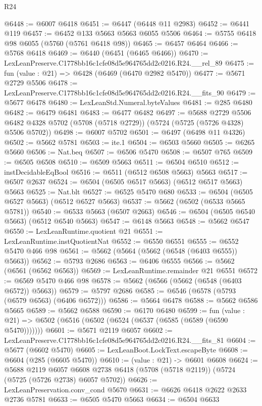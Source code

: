 \begin{lexlean}{R24}
\begin{coremodule}
@6448 := @6007 @6418
@6451 := @6447 (@6448 @11 @2983)
@6452 := @6441 @119
@6457 := @6452 @133 @5663 @5663 @6055 @5506
@6464 := @5755 @6418 @98 @6055 (@5760 (@5761 @6418 @98))
@6465 := @6457 @6464
@6466 := @5768 @6418
@6469 := @6440 (@6451 (@6465 @6466))
@6470 := LexLeanPreserve.C1778bb16c1cfe08d5e964765dd2c0216.R24.__rel_89
@6475 := fun (value : @21) => @6428 (@6469 (@6470 @2982 @5470))
@6477 := @5671 @2729 @5506
@6478 := LexLeanPreserve.C1778bb16c1cfe08d5e964765dd2c0216.R24.__fits_90
@6479 := @5677 @6478
@6480 := LexLeanStd.Numeral.byteValues
@6481 := @285 @6480
@6482 := @6479 @6481
@6483 := @6477 @6482
@6497 := @5688
    @2729
    @5506
    @6482
    @4328
    @5702
    (@5708 (@5718 @2729))
    (@5724 (@5725 (@5726 @4328) @5506 @5702))
@6498 := @6007 @5702
@6501 := @6497 (@6498 @11 @4326)
@6502 := @5662 @5781
@6503 := ite.{1}
@6504 := @6503 @5660
@6505 := @6265 @5660
@6506 := Nat.beq
@6507 := @6506 @5470
@6508 := @6507 @765
@6509 := @6505 @6508
@6510 := @6509 @5663
@6511 := @6504 @6510
@6512 := instDecidableEqBool
@6516 := @6511 (@6512 @6508 @5663) @5663
@6517 := @6507 @2637
@6524 := @6504 (@6505 @6517 @5663) (@6512 @6517 @5663) @5663
@6525 := Nat.blt
@6527 := @6525 @5470 @680
@6533 := @6504 (@6505 @6527 @5663) (@6512 @6527 @5663)
@6537 := @5662 (@6502 (@6533 @5665 @5781))
@6540 := @6533 @5663 (@6507 @2663)
@6546 := @6504 (@6505 @6540 @5663) (@6512 @6540 @5663)
@6547 := @6148 @5663
@6548 := @5662 @6547
@6550 := LexLeanRuntime.quotient @21
@6551 := LexLeanRuntime.instQuotientNat
@6552 := @6550 @6551
@6555 := @6552 @5470 @466 @98
@6561 := @5662 (@5664 (@5662 (@6548 (@6403 @6555)) @5663))
@6562 := @5793 @2686
@6563 := @6406 @6555
@6566 := @5662 (@6561 (@6562 @6563))
@6569 := LexLeanRuntime.remainder @21 @6551
@6572 := @6569 @5470 @466 @98
@6578 := @5662 (@6566 (@5662 (@6548 (@6403 @6572)) @5663))
@6579 := @5797 @2686
@6585 := @6546 (@6578 (@5793 (@6579 @6563) (@6406 @6572)))
@6586 := @5664 @6478
@6588 := @5662 @6586 @5665
@6589 := @5662 @6588
@6590 := @6170 @6480
@6599 := fun (value : @21) => @6502 (@6516 (@6502 (@6524 (@6537 (@6585 (@6589 (@6590 @5470)))))))
@6601 := @5671 @2119 @6057
@6602 := LexLeanPreserve.C1778bb16c1cfe08d5e964765dd2c0216.R24.__fits_81
@6604 := @5677 (@6602 @5470)
@6605 := LexLeanBoot.LockText.escapeByte
@6608 := @6604 (@285 (@6605 @5470))
@6610 := (value : @21) -> @6601 @6608
@6624 := @5688
    @2119
    @6057
    @6608
    @2738
    @6418
    (@5708 (@5718 @2119))
    (@5724 (@5725 (@5726 @2738) @6057 @5702))
@6626 := LexLeanPreservation.conv_cond @5670
@6631 := @6626 @6418 @2622 @2633 @2736 @5781
@6633 := @6505 @5470 @5663
@6634 := @6504 @6633

\end{coremodule}
\end{lexlean}

